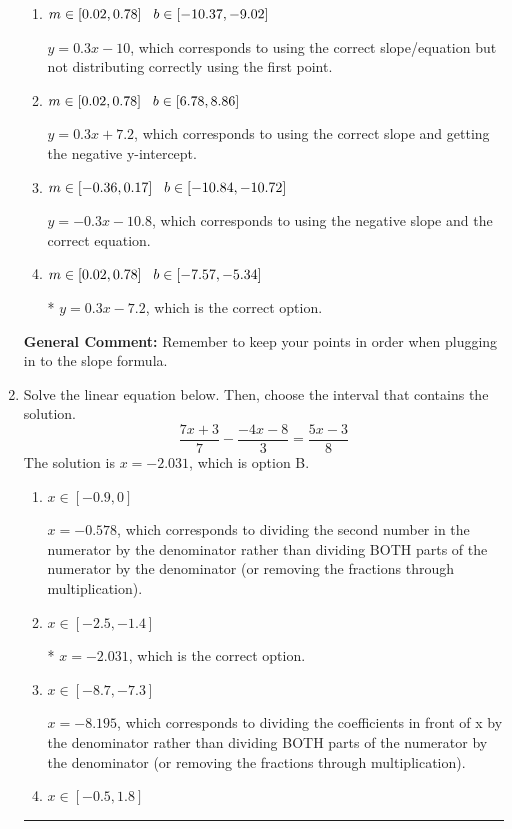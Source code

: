 \documentclass{extbook}[14pt]
\newcommand{\litem}[1]{\item #1

\rule{\textwidth}{0.4pt}}
\begin{document}
\begin{enumerate}
{\begin{enumerate}[label=\Alph*.]
 $y = 0.3x -3$, which corresponds to using the correct slope/equation but not distributing correctly using the second point.
\item \( m \in [0.02, 0.78] \hspace*{3mm} b \in [-10.37, -9.02] \)

 $y = 0.3x -10$, which corresponds to using the correct slope/equation but not distributing correctly using the first point.
\item \( m \in [0.02, 0.78] \hspace*{3mm} b \in [6.78, 8.86] \)

 $y = 0.3x + 7.2$, which corresponds to using the correct slope and getting the negative y-intercept.
\item \( m \in [-0.36, 0.17] \hspace*{3mm} b \in [-10.84, -10.72] \)

 $y = -0.3x -10.8$, which corresponds to using the negative slope and the correct equation.
\item \( m \in [0.02, 0.78] \hspace*{3mm} b \in [-7.57, -5.34] \)

* $y = 0.3x -7.2$, which is the correct option.
\end{enumerate}

\textbf{General Comment:} Remember to keep your points in order when plugging in to the slope formula.
}
\litem{
Solve the linear equation below. Then, choose the interval that contains the solution.
\[ \frac{7x + 3}{7} - \frac{-4x -8}{3} = \frac{5x -3}{8} \]The solution is \( x = -2.031 \), which is option B.\begin{enumerate}[label=\Alph*.]
\item \( x \in [-0.9, 0] \)

 $x = -0.578$, which corresponds to dividing the second number in the numerator by the denominator rather than dividing BOTH parts of the numerator by the denominator (or removing the fractions through multiplication).
\item \( x \in [-2.5, -1.4] \)

* $x = -2.031$, which is the correct option.
\item \( x \in [-8.7, -7.3] \)

 $x = -8.195$, which corresponds to dividing the coefficients in front of x by the denominator rather than dividing BOTH parts of the numerator by the denominator (or removing the fractions through multiplication).
\item \( x \in [-0.5, 1.8] \)


\end{enumerate}}
\end{enumerate}
\end{document}
